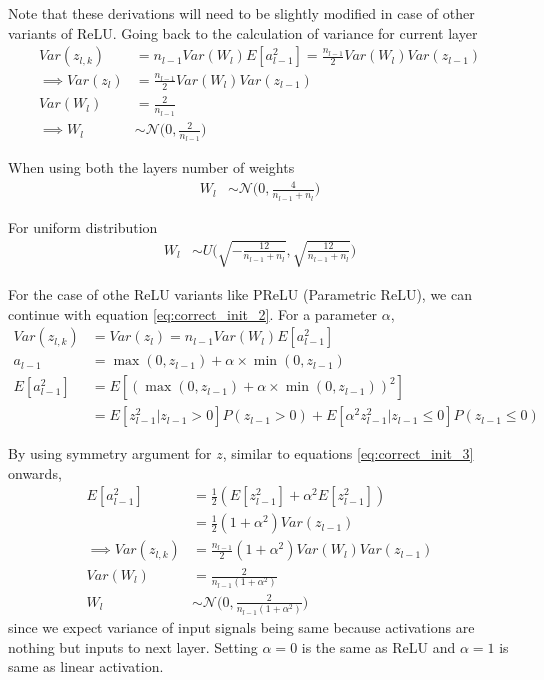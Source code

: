 \documentclass[../../deep_learning_notes.tex]{subfiles}
\begin{document}
Note that these derivations will need to be slightly modified in case of other variants of ReLU. Going back to the calculation of variance for current layer
\begin{align*}
    Var(z_{l, k}) &= n_{l-1}Var(W_{l}) E[a_{l-1}^{2}] = \frac{n_{l-1}}{2}Var(W_{l})Var(z_{l-1})\\
    \implies Var(z_{l}) &= \frac{n_{l-1}}{2}Var(W_{l})Var(z_{l-1})\\
    Var(W_{l}) &= \frac{2}{n_{l-1}}\\
    \implies W_{l} &\sim \mathcal{N}\bigg(0, \frac{2}{n_{l-1}}\bigg)
\end{align*}

When using both the layers number of weights
\begin{align*}
    W_{l} &\sim \mathcal{N}\bigg(0, \frac{4}{n_{l-1} + n_{l}}\bigg)
\end{align*}

For uniform distribution
\begin{align*}
    W_{l} &\sim U\bigg(\sqrt{-\frac{12}{n_{l-1} + n_{l}}}, \sqrt{\frac{12}{n_{l-1} + n_{l}}} \bigg)
\end{align*}

For the case of othe ReLU variants like PReLU (Parametric ReLU), we can continue with equation \eqref{eq:correct_init_2}. For a parameter $\alpha$,
\begin{align*}
    Var(z_{l, k}) &= Var(z_{l}) = n_{l-1}Var(W_{l}) E[a_{l-1}^{2}]\\
    a_{l-1} &= \max(0, z_{l-1}) + \alpha \times \min(0, z_{l-1})\\
    E[a_{l-1}^{2}] &= E[(\max(0, z_{l-1}) + \alpha \times \min(0, z_{l-1}))^{2}]\\
    &= E[z_{l-1}^{2}|z_{l-1} > 0]P(z_{l-1} > 0) + E[\alpha^{2} z_{l-1}^{2}|z_{l-1} \leq 0]P(z_{l-1} \leq 0)
\end{align*}

By using symmetry argument for $z$, similar to equations \eqref{eq:correct_init_3} onwards,
\begin{align*}
    E[a_{l-1}^{2}] &= \frac{1}{2}(E[z_{l-1}^{2}]  + \alpha^{2} E[z_{l-1}^{2}])\\
    &= \frac{1}{2}(1 + \alpha^{2})Var(z_{l-1})\\
    \implies Var(z_{l, k}) &= \frac{n_{l-1}}{2}(1 + \alpha^{2})Var(W_{l})Var(z_{l-1})\\
    Var(W_{l}) &= \frac{2}{n_{l-1}(1 + \alpha^{2})} \\
    W_{l} &\sim \mathcal{N}\bigg(0, \frac{2}{n_{l-1}(1 + \alpha^{2})}\bigg)
\end{align*}
since we expect variance of input signals being same because activations are nothing but inputs to next layer. Setting $\alpha = 0$ is the same as ReLU and $\alpha = 1$ is same as linear activation.\newline
\end{document}
